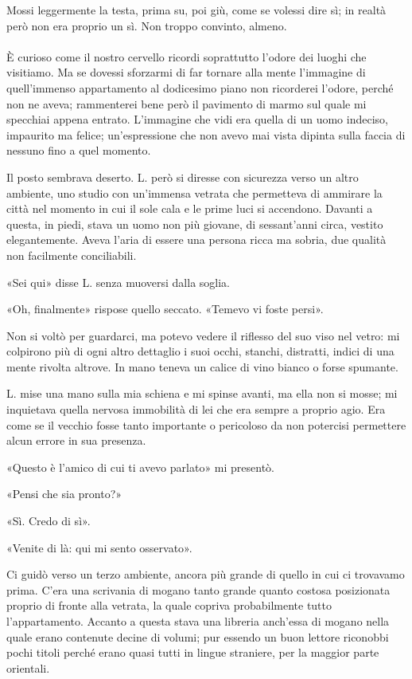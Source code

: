 \documentclass[a4paper,12pt]{book}
\begin{document}
Mossi leggermente la testa, prima su, poi giù, come se volessi dire sì; in
realtà però non era proprio un sì. Non troppo convinto, almeno.

\paragraph{}
È curioso come il nostro cervello ricordi soprattutto l'odore dei luoghi che
visitiamo. Ma se dovessi sforzarmi di far tornare alla mente l'immagine di
quell'immenso appartamento al dodicesimo piano non ricorderei l'odore,
perché non ne aveva; rammenterei bene però il pavimento di marmo sul quale
mi specchiai appena entrato. L'immagine che vidi era quella di un uomo
indeciso, impaurito ma felice; un'espressione che non avevo mai vista dipinta
sulla faccia di nessuno fino a quel momento.

Il posto sembrava deserto. L. però si diresse con sicurezza verso un altro
ambiente, uno studio con un'immensa vetrata che permetteva di ammirare la
città nel momento in cui il sole cala e le prime luci si accendono. Davanti a
questa, in piedi, stava un uomo non più giovane, di sessant'anni circa, vestito
elegantemente. Aveva l'aria di essere una persona ricca ma sobria, due qualità
non facilmente conciliabili.

«Sei qui» disse L. senza muoversi dalla soglia.

«Oh, finalmente» rispose quello seccato. «Temevo vi foste persi».

Non si voltò per guardarci, ma potevo vedere il riflesso del suo viso nel
vetro: mi colpirono più di ogni altro dettaglio i suoi occhi, stanchi,
distratti, indici di una mente rivolta altrove. In mano teneva un calice di vino
bianco o forse spumante.

L. mise una mano sulla mia schiena e mi spinse avanti, ma ella non si mosse; mi
inquietava quella nervosa immobilità di lei che era sempre a proprio agio. Era
come se il vecchio fosse tanto importante o pericoloso da non potercisi
permettere alcun errore in sua presenza.

«Questo è l'amico di cui ti avevo parlato» mi presentò.

«Pensi che sia pronto?»

«Sì. Credo di sì».

«Venite di là: qui mi sento osservato».

Ci guidò verso un terzo ambiente, ancora più grande di quello in cui ci
trovavamo prima. C'era una scrivania di mogano tanto grande quanto costosa
posizionata proprio di fronte alla vetrata, la quale copriva probabilmente tutto
l'appartamento. Accanto a questa stava una libreria anch'essa di mogano
nella quale erano contenute decine di volumi; pur essendo un buon lettore
riconobbi pochi titoli perché erano quasi tutti in lingue straniere, per la
maggior parte orientali.
\end{document}
